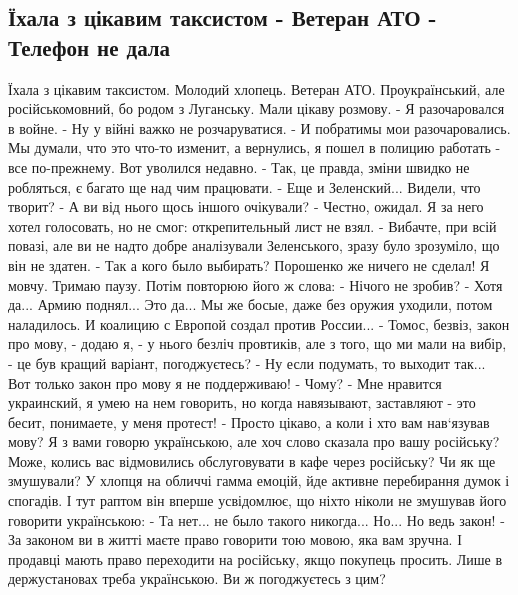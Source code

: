  
 
 
 
 
\subsection{Їхала з цікавим таксистом - Ветеран АТО - Телефон не дала}

Їхала з цікавим таксистом. Молодий хлопець. Ветеран АТО. Проукраїнський, але російськомовний, бо родом з Луганську. Мали цікаву розмову. 
- Я разочаровался в войне.
- Ну у війні важко не розчаруватися.
- И побратимы мои разочаровались. Мы думали, что это что-то изменит, а вернулись, я пошел в полицию работать - все по-прежнему. Вот уволился недавно.
- Так, це правда, зміни швидко не робляться, є багато ще над чим працювати. 
- Еще и Зеленский... Видели, что творит?
- А ви від нього щось іншого очікували?
- Честно, ожидал. Я за него хотел голосовать, но не смог: открепительный лист не взял. 
- Вибачте, при всій повазі, але ви не надто добре аналізували Зеленського, зразу було зрозуміло, що він не здатен. 
- Так а кого было выбирать? Порошенко же ничего не сделал!
Я мовчу. Тримаю паузу. Потім повторюю його ж слова:
- Нічого не зробив?
- Хотя да... Армию поднял... Это да... Мы же босые, даже без оружия уходили, потом наладилось. И коалицию с Европой создал против России...
- Томос, безвіз, закон про мову, - додаю я, - у нього безліч провтиків, але з того, що ми мали на вибір, - це був кращий варіант, погоджуєтесь?
- Ну если подумать, то выходит так... Вот только закон про мову я не поддерживаю!
- Чому?
- Мне нравится украинский, я умею на нем говорить, но когда навязывают, заставляют - это бесит, понимаете, у меня протест!
- Просто цікаво, а коли і хто вам нав‘язував мову? Я з вами говорю українською, але хоч слово сказала про вашу російську? Може, колись вас відмовились обслуговувати в кафе через російську? Чи як ще змушували?
У хлопця на обличчі гамма емоцій, йде активне перебирання думок і спогадів. І тут раптом він вперше усвідомлює, що ніхто ніколи не змушував його говорити українською:
- Та нет... не было такого никогда... Но... Но ведь закон!
- За законом ви в житті маєте право говорити тою мовою, яка вам зручна. І продавці мають право переходити на російську, якщо покупець просить. Лише в держустановах треба українською. Ви ж погоджуєтесь з цим?
